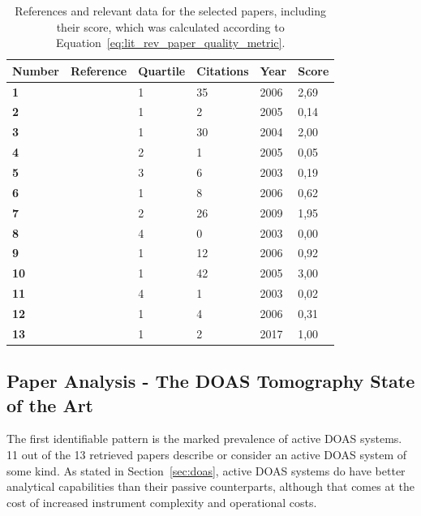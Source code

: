 \begin{table}[htb]
    \centering
    \small
    \caption{References and relevant data for the selected papers,
        including their score, which was calculated according to
        Equation~\ref{eq:lit_rev_paper_quality_metric}.}
    \label{tab:lit_rev_selected_articles}
    \begin{tabular}{@{}llllll@{}}
    \toprule
    \textbf{Number} & \textbf{Reference} & \textbf{Quartile} &
    \textbf{Citations} & \textbf{Year} & \textbf{Score} \\ \midrule
    \textbf{1} & \cite{Hartl2006} & 1 & 35 & 2006 & 2,69 \\
    \midrule
    \textbf{2} & \cite{Hartl2005} & 1 & 2 & 2005 & 0,14 \\
    \midrule
    \textbf{3} & \cite{Laepple2004} & 1 & 30 & 2004 & 2,00 \\
    \midrule
    \textbf{4} & \cite{Pundt2005} & 2 & 1 & 2005 & 0,05 \\
    \midrule
    \textbf{5} & \cite{Murphy2003} & 3 & 6 & 2003 & 0,19 \\
    \midrule
    \textbf{6} & \cite{Frins2006} & 1 & 8 & 2006 & 0,62 \\
    \midrule
    \textbf{7} & \cite{Johansson2009} & 2 & 26 & 2009 & 1,95 \\
    \midrule
    \textbf{8} & \cite{ODriscoll2003} & 4 & 0 & 2003 & 0,00 \\
    \midrule
    \textbf{9} & \cite{Pundt2006} & 1 & 12 & 2006 & 0,92 \\
    \midrule
    \textbf{10} & \cite{Pundt2005b} & 1 & 42 & 2005 & 3,00 \\
    \midrule
    \textbf{11} & \cite{ODriscoll2003a} & 4 & 1 & 2003 & 0,02 \\
    \midrule
    \textbf{12} & \cite{Mettendorf2006} & 1 & 4 & 2006 & 0,31 \\
    \midrule
    \textbf{13} & \cite{Casaballe2017} & 1 & 2 & 2017 & 1,00 \\ \bottomrule
    \end{tabular}
\end{table}



\subsection{Paper Analysis - The DOAS Tomography State of the Art}%
\label{sub:paper_analysis_the_doas_tomography_state_of_the_art}

The first identifiable pattern is the marked prevalence of active
\gls{DOAS} systems. 11 out of the 13 retrieved papers describe or
consider an active \gls{DOAS} system of some kind. As stated in
Section~\ref{sec:doas}, active \gls{DOAS} systems do have better
analytical capabilities than their passive counterparts, although that
comes at the cost of increased instrument complexity and operational
costs. 

